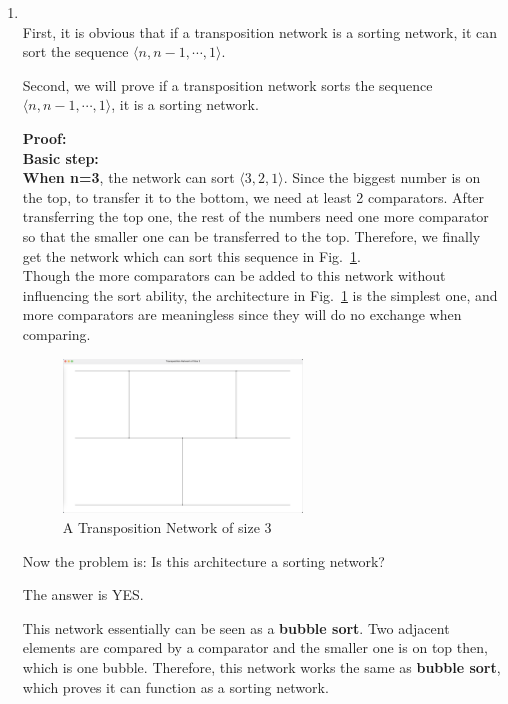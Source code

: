 \documentclass[12pt,a4paper]{article}
\makeatletter
\newtheorem*{solution}{Solution}
\theoremstyle{definition}
\renewenvironment{solution}[1][Solution] {\par\pushQED{\qed}\normalfont\topsep6\p@\@plus6\p@\relax\trivlist\item[\hskip\labelsep\bfseries#1\@addpunct{.}]\ignorespaces}{\popQED\endtrivlist\@endpefalse} \makeatother
\makeatother
\begin{document}
\begin{enumerate}
\begin{solution}
\begin{enumerate}
~\\


First, it is obvious that if a transposition network is a sorting network, it can sort the sequence $\langle n, n-1, \cdots, 1 \rangle$. 

Second, we will prove if a transposition network sorts the sequence $\langle n, n-1, \cdots, 1 \rangle$, it is a sorting network.

\textbf{Proof:}\\

\textbf{Basic step:}\\

\textbf{When n=3}, the network can sort $\langle 3, 2, 1 \rangle$. Since the biggest number is on the top, to transfer it to the bottom, we need at least 2 comparators. After transferring the top one, the rest of the numbers need one more comparator so that the smaller one can be transferred to the top. Therefore, we finally get the network which can sort this sequence in Fig.~\ref{s3}.\\

Though the more comparators can be added to this network without influencing the sort ability, the architecture in Fig.~\ref{s3} is the simplest one, and more comparators are meaningless since they will do no exchange when comparing.\\



\begin{figure}[htbp]
    \centering
    \includegraphics[width=0.6\textwidth]{size3.png}
    \caption{A Transposition Network of size 3}\label{s3}
\end{figure}

Now the problem is: Is this architecture a sorting network?

The answer is YES.

This network essentially can be seen as a \textbf{bubble sort}. Two adjacent elements are compared by a comparator and the smaller one is on top then, which is one bubble. Therefore, this network works the same as \textbf{bubble sort}, which proves it can function as a sorting network.


\end{enumerate}
\end{solution}
\end{enumerate}
\end{document}
